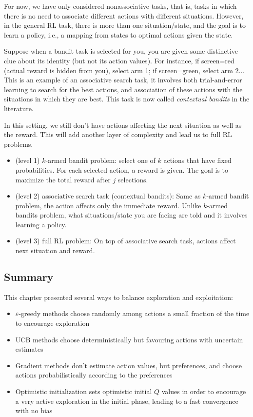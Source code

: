 \documentclass[sutton_barto_notes.tex]{subfiles}
\begin{document}
For now, we have only considered nonassociative tasks, that is, tasks in which there is no need to associate different actions with different situations.
However, in the general RL task, there is more than one situation/state, and the goal is to learn a policy, i.e., a mapping from states to optimal actions given the state.

Suppose when a bandit task is selected for you, you are given some distinctive clue about its identity (but not its action values). For instance, if screen=red (actual reward is hidden from you), select arm 1; if screen=green, select arm 2... This is an example of an associative search task, it involves both trial-and-error learning to search for the best actions, and association of these actions with the situations in which they are best. This task is now called \textit{contextual bandits} in the literature.

In this setting, we still don't have actions affecting the next situation as well as the reward. This will add another layer of complexity and lead us to full RL problems.

\begin{itemize}
\item (level 1) $k$-armed bandit problem: select one of $k$ actions that have fixed probabilities. For each selected action, a reward is given. The goal is to maximize the total reward after $j$ selections.
\item (level 2) associative search task (contextual bandits): Same as $k$-armed bandit problem, the action affects only the immediate reward. Unlike $k$-armed bandits problem, what situations/state you are facing are told and it involves learning a policy.
\item (level 3) full RL problem: On top of associative search task, actions affect next situation and reward.
\end{itemize}

\subsection{Summary}

This chapter presented several ways to balance exploration and exploitation:

\begin{itemize}
\item $\varepsilon$-greedy methods choose randomly among actions a small fraction of the time to encourage exploration
\item UCB methods choose deterministically but favouring actions with uncertain estimates
\item Gradient methods don't estimate action values, but preferences, and choose actions probabilistically according to the preferences
\item Optimistic initialization sets optimistic initial $Q$ values in order to encourage a very active exploration in the initial phase, leading to a fast convergence with no bias
\end{itemize}
\end{document}

